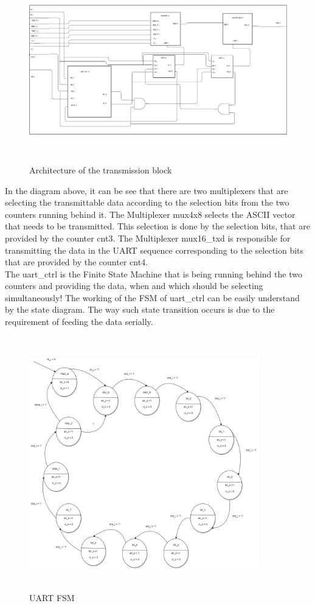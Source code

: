 \documentclass[12pt,a4paper]{article}
\begin{document}
\begin{figure}[H]
\centering
\includegraphics[width=16cm,height=8cm]{transmmistion.PNG}
\caption{Architecture of the transmission block}
\label{Architecture of the transmission block}
\end{figure}

In the diagram above, it can be see that there are two multiplexers that are selecting the transmittable data according to the selection bits from the two counters running behind it. The Multiplexer  mux4x8 selects the ASCII vector that needs to be transmitted. This selection is done by the selection bits, that are provided by the counter cnt3. The Multiplexer mux16\_txd is responsible for transmitting the data in the UART sequence corresponding to the selection bits that are provided by the counter cnt4.\\

The uart\_ctrl is the Finite State Machine that is being running behind the two counters and providing the data, when and which should be selecting simultaneously! The working of the FSM of uart\_ctrl can be easily understand by the state diagram. The way such state transition occurs is due to the requirement of feeding the data serially.\\

\begin{figure}[H]
\centering
\includegraphics[width=10cm,height=11cm]{uartFsm.jpg}
\caption{UART FSM}
\label{UART FSM}
\end{figure}
\end{document}

